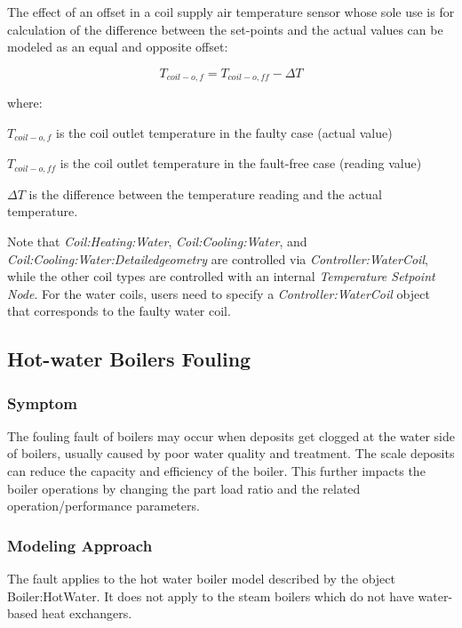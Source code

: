 The effect of an offset in a coil supply air temperature sensor whose sole use is for calculation of the difference between the set-points and the actual values can be modeled as an equal and opposite offset:

\begin{equation}
T_{coil-o,f} = T_{coil-o,ff} - \Delta T
\end{equation}

where:

\(T_{coil-o,f}\) is the coil outlet temperature in the faulty case (actual value)

\(T_{coil-o,ff}\) is the coil outlet temperature in the fault-free case (reading value)

\(\Delta T\) is the difference between the temperature reading and the actual temperature.

Note that \emph{Coil:Heating:Water}, \emph{Coil:Cooling:Water}, and \emph{Coil:Cooling:Water:Detailedgeometry} are controlled via \emph{Controller:WaterCoil}, while the other coil types are controlled with an internal \emph{Temperature Setpoint Node}. For the water coils, users need to specify a \emph{Controller:WaterCoil} object that corresponds to the faulty water coil.


\subsection{Hot-water Boilers Fouling}\label{hot-water-boiler-fouling}

\subsubsection{Symptom}

The fouling fault of boilers may occur when deposits get clogged at the water side of boilers, usually caused by poor water quality and treatment. The scale deposits can reduce the capacity and efficiency of the boiler. This further impacts the boiler operations by changing the part load ratio and the related operation/performance parameters.

\subsubsection{Modeling Approach}

The fault applies to the hot water boiler model described by the object Boiler:HotWater. It does not apply to the steam boilers which do not have water-based heat exchangers.

